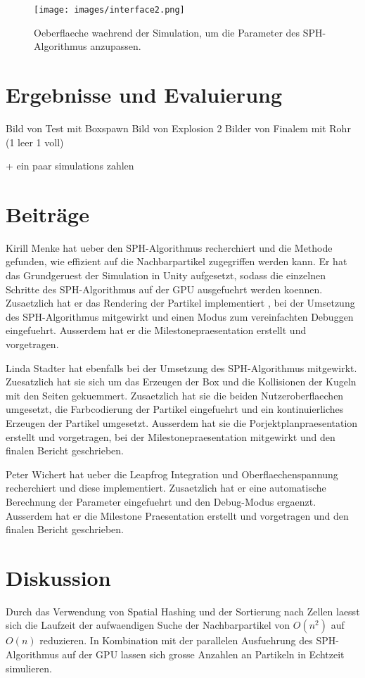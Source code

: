 \documentclass[a4paper]{paper}
\begin{document}
\begin{figure}[t]
    \centering
    \texttt{[image: images/interface2.png]}
    \caption{Oeberflaeche waehrend der Simulation, um die Parameter des SPH-Algorithmus anzupassen.}
    \label{fig:interface2}
\end{figure}

\section{Ergebnisse und Evaluierung}
Bild von Test mit Boxspawn
Bild von Explosion
2 Bilder von Finalem mit Rohr (1 leer 1 voll)

+ ein paar simulations zahlen

\section{Beiträge}
Kirill Menke hat ueber den SPH-Algorithmus recherchiert und die Methode gefunden, wie 
effizient auf die Nachbarpartikel zugegriffen werden kann. Er hat das Grundgeruest der Simulation in Unity aufgesetzt, sodass die einzelnen Schritte des SPH-Algorithmus auf der GPU ausgefuehrt werden koennen. Zusaetzlich hat er das Rendering der Partikel implementiert , bei der Umsetzung des SPH-Algorithmus mitgewirkt und einen Modus zum vereinfachten Debuggen eingefuehrt. Ausserdem hat er die Milestonepraesentation erstellt und vorgetragen. 

Linda Stadter hat ebenfalls bei der Umsetzung des SPH-Algorithmus mitgewirkt. Zuesatzlich hat sie sich um das Erzeugen der Box und die Kollisionen der Kugeln mit den Seiten gekuemmert. Zusaetzlich hat sie die beiden Nutzeroberflaechen umgesetzt, die Farbcodierung der Partikel eingefuehrt und ein kontinuierliches Erzeugen der Partikel umgesetzt. Ausserdem hat sie die Porjektplanpraesentation erstellt und vorgetragen, bei der Milestonepraesentation mitgewirkt und den finalen Bericht geschrieben.

Peter Wichert hat ueber die Leapfrog Integration und Oberflaechenspannung recherchiert und diese implementiert. Zusaetzlich hat er eine automatische Berechnung der Parameter eingefuehrt und den Debug-Modus ergaenzt. Ausserdem hat er die Milestone Praesentation erstellt und vorgetragen und den finalen Bericht geschrieben.



\section{Diskussion}
Durch das Verwendung von Spatial Hashing und der Sortierung nach Zellen laesst sich die Laufzeit der aufwaendigen Suche der Nachbarpartikel von $O(n^2)$ auf $O(n)$ reduzieren.
In Kombination mit der parallelen Ausfuehrung des SPH-Algorithmus auf der GPU lassen sich grosse Anzahlen an Partikeln in Echtzeit simulieren.
\end{document}
